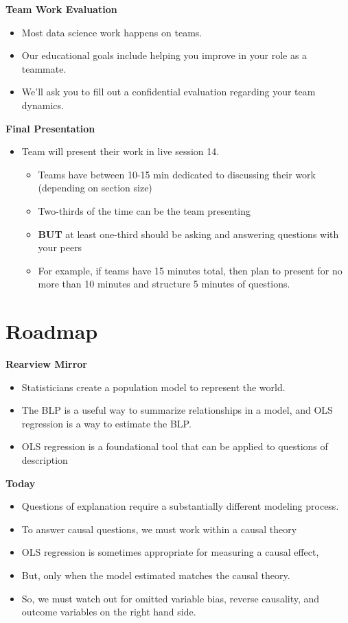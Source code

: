 \documentclass[
  letterpaper,
  DIV=11,
  numbers=noendperiod]{scrreprt}
\providecommand{\tightlist}{%
  \setlength{\itemsep}{0pt}\setlength{\parskip}{0pt}}\usepackage{longtable,booktabs,array}
\begin{document}
\textbf{Team Work Evaluation}

\begin{itemize}
\tightlist
\item
  Most data science work happens on teams.
\item
  Our educational goals include helping you improve in your role as a
  teammate.
\item
  We'll ask you to fill out a confidential evaluation regarding your
  team dynamics.
\end{itemize}

\textbf{Final Presentation}

\begin{itemize}
\tightlist
\item
  Team will present their work in live session 14.

  \begin{itemize}
  \tightlist
  \item
    Teams have between 10-15 min dedicated to discussing their work
    (depending on section size)
  \item
    Two-thirds of the time can be the team presenting
  \item
    \textbf{BUT} at least one-third should be asking and answering
    questions with your peers
  \item
    For example, if teams have 15 minutes total, then plan to present
    for no more than 10 minutes and structure 5 minutes of questions.
  \end{itemize}
\end{itemize}

\section{Roadmap}\label{roadmap-7}

\textbf{Rearview Mirror}

\begin{itemize}
\tightlist
\item
  Statisticians create a population model to represent the world.
\item
  The BLP is a useful way to summarize relationships in a model, and OLS
  regression is a way to estimate the BLP.
\item
  OLS regression is a foundational tool that can be applied to questions
  of description
\end{itemize}

\textbf{Today}

\begin{itemize}
\tightlist
\item
  Questions of explanation require a substantially different modeling
  process.
\item
  To answer causal questions, we must work within a causal theory
\item
  OLS regression is sometimes appropriate for measuring a causal effect,
\item
  But, only when the model estimated matches the causal theory.
\item
  So, we must watch out for omitted variable bias, reverse causality,
  and outcome variables on the right hand side.
\end{itemize}
\end{document}

